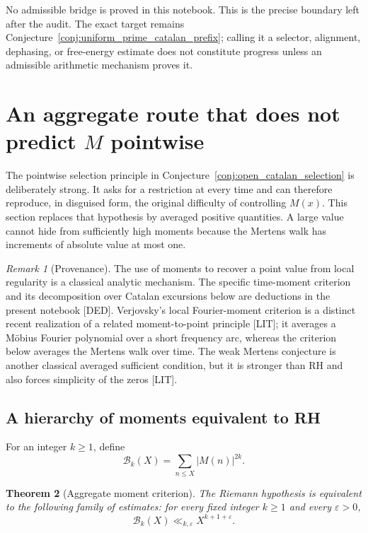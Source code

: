\documentclass[11pt]{amsart}
\numberwithin{equation}{section}
\theoremstyle{plain}
\newtheorem{theorem}{Theorem}[section]
\theoremstyle{definition}
\theoremstyle{remark}
\newtheorem{remark}[theorem]{Remark}
\newcommand{\Mert}{M}
\newcommand{\eps}{\varepsilon}
\begin{document}
No admissible bridge is proved in this notebook.  This is the precise boundary
left after the audit.  The exact target remains
Conjecture~\ref{conj:uniform_prime_catalan_prefix}; calling it a selector,
alignment, dephasing, or free-energy estimate does not constitute progress
unless an admissible arithmetic mechanism proves it.

\section{An aggregate route that does not predict $\Mert$ pointwise}
\label{sec:aggregate_moment_route}

The pointwise selection principle in
Conjecture~\ref{conj:open_catalan_selection} is deliberately strong.  It asks
for a restriction at every time and can therefore reproduce, in disguised
form, the original difficulty of controlling $\Mert(x)$.  This section replaces
that hypothesis by averaged positive quantities.  A large value cannot hide
from sufficiently high moments because the Mertens walk has increments of
absolute value at most one.

\begin{remark}[Provenance]
\label{rem:aggregate_provenance}
The use of moments to recover a point value from local regularity is a classical
analytic mechanism.  The specific time-moment criterion and its decomposition
over Catalan excursions below are deductions in the present notebook
\textnormal{[DED]}.  Verjovsky's local Fourier-moment criterion is a distinct
recent realization of a related moment-to-point principle \cite{Verjovsky2026}
\textnormal{[LIT]}; it averages a M\"obius Fourier polynomial over a short
frequency arc, whereas the criterion below averages the Mertens walk over
time.  The weak Mertens conjecture is another classical averaged sufficient
condition, but it is stronger than RH and also forces simplicity of the zeros
\cite{Ng2004} \textnormal{[LIT]}.
\end{remark}

\subsection{A hierarchy of moments equivalent to RH}

For an integer $k\geq1$, define
\begin{equation}
\mathcal B_k(X)=\sum_{n\leq X}|\Mert(n)|^{2k}.
\label{eq:ordinary_time_moment}
\end{equation}

\begin{theorem}[Aggregate moment criterion]
\label{thm:aggregate_moment_criterion}
The Riemann hypothesis is equivalent to the following family of estimates: for
every fixed integer $k\geq1$ and every $\eps>0$,
\begin{equation}
\mathcal B_k(X)
\ll_{k,\eps}X^{k+1+\eps}.
\label{eq:aggregate_moment_bound}
\end{equation}
\end{theorem}
\end{document}
